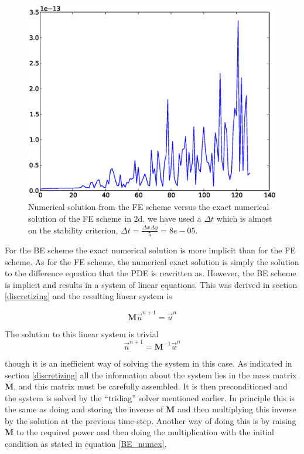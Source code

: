 \begin{figure}[H]
 \centering
 \includegraphics[scale=0.7]{Figures/exact_numerical_2d_n130.eps}
 \caption{Numerical solution from the FE scheme versus the exact numerical solution of the FE scheme in 2d. we have used a $\Delta t$ which is almost on the stability criterion, $\Delta t = \frac{\Delta x \Delta y}{5} = 8e-05$.}
 \label{exact_numerical_2d_n130}
\end{figure}

For the BE scheme the exact numerical solution is more implicit than for the FE scheme. 
As for the FE scheme, the numerical exact solution is simply the solution to the difference equation that the PDE is rewritten as. 
However, the BE scheme is implicit and results in a system of linear equations. 
This was derived in section \ref{discretizing} and the resulting linear system is

\begin{equation*}
 \mathbf M \vec u^{n+1} = \vec u^n
\end{equation*}

The solution to this linear system is trivial
\begin{equation*}
 \vec u^{n+1} = \mathbf M^{-1} \vec u^n
\end{equation*}

though it is an inefficient way of solving the system in this case. 
As indicated in section \ref{discretizing} all the information about the system lies in the mass matrix $\mathbf M$, and this matrix must be carefully assembled. 
It is then preconditioned and the system is solved by the ``tridiag'' solver mentioned earlier. 
In principle this is the same as doing and storing the inverse of $\mathbf M$ and then multiplying this inverse by the solution at the previous time-step. 
Another way of doing this is by raising $\mathbf M$ to the required power and then doing the multiplication with the initial condition as stated in equation \eqref{BE_numex}.

